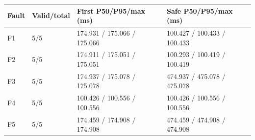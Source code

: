 \begin{tabular}{@{}llll@{}}
\toprule
Fault & Valid/total & First P50/P95/max (ms) & Safe P50/P95/max (ms) \\
\midrule
F1 & 5/5 & 174.931 / 175.066 / 175.066 & 100.427 / 100.433 / 100.433 \\
F2 & 5/5 & 174.911 / 175.051 / 175.051 & 100.293 / 100.419 / 100.419 \\
F3 & 5/5 & 174.937 / 175.078 / 175.078 & 474.937 / 475.078 / 475.078 \\
F4 & 5/5 & 100.426 / 100.556 / 100.556 & 100.426 / 100.556 / 100.556 \\
F5 & 5/5 & 174.459 / 174.908 / 174.908 & 474.459 / 474.908 / 474.908 \\
\bottomrule
\end{tabular}
